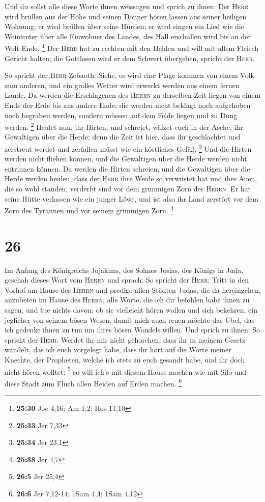  Und du sollst alle diese Worte ihnen weissagen und
sprich zu ihnen: Der \textsc{Herr} wird brüllen aus der Höhe und seinen
Donner hören lassen aus seiner heiligen Wohnung; er wird brüllen über
seine Hürden; er wird singen ein Lied wie die Weintreter über alle
Einwohner des Landes, des Hall erschallen wird bis an der Welt Ende.
\footnote{\textbf{25:30} Joe 4,16; Am 1,2; Hos 11,10} 
Der \textsc{Herr} hat zu rechten mit den Heiden und will mit allem
Fleisch Gericht halten; die Gottlosen wird er dem Schwert übergeben,
spricht der \textsc{Herr}.

 So spricht der \textsc{Herr} Zebaoth: Siehe, es wird
eine Plage kommen von einem Volk zum anderen, und ein großes Wetter wird
erweckt werden aus einem fernen Lande.  Da werden die
Erschlagenen des \textsc{Herrn} zu derselben Zeit liegen von einem Ende
der Erde bis ans andere Ende; die werden nicht beklagt noch aufgehoben
noch begraben werden, sondern müssen auf dem Felde liegen und zu Dung
werden. \footnote{\textbf{25:33} Jer 7,33}  Heulet nun,
ihr Hirten, und schreiet, wälzet euch in der Asche, ihr Gewaltigen über
die Herde; denn die Zeit ist hier, dass ihr geschlachtet und zerstreut
werdet und zerfallen müsst wie ein köstliches Gefäß. \footnote{\textbf{25:34}
  Jer 23,1}  Und die Hirten werden nicht fliehen können,
und die Gewaltigen über die Herde werden nicht entrinnen können.
 Da werden die Hirten schreien, und die Gewaltigen über
die Herde werden heulen, dass der \textsc{Herr} ihre Weide so verwüstet
hat  und ihre Auen, die so wohl standen, verderbt sind
vor dem grimmigen Zorn des \textsc{Herrn}.  Er hat seine
Hütte verlassen wie ein junger Löwe, und ist also ihr Land zerstört vor
dem Zorn des Tyrannen und vor seinem grimmigen Zorn. \footnote{\textbf{25:38}
  Jer 4,7}

\hypertarget{section-5}{%
\section{26}\label{section-5}}

 Im Anfang des Königreichs Jojakims, des Sohnes Josias,
des Königs in Juda, geschah dieses Wort vom \textsc{Herrn} und sprach:
 So spricht der \textsc{Herr}: Tritt in den Vorhof am
Hause des \textsc{Herrn} und predige allen Städten Judas, die da
hereingehen, anzubeten im Hause des \textsc{Herrn}, alle Worte, die ich
dir befohlen habe ihnen zu sagen, und tue nichts davon; 
ob sie vielleicht hören wollen und sich bekehren, ein jeglicher von
seinem bösen Wesen, damit mich auch reuen möchte das Übel, das ich
gedenke ihnen zu tun um ihres bösen Wandels willen.  Und
sprich zu ihnen: So spricht der \textsc{Herr}: Werdet ihr mir nicht
gehorchen, dass ihr in meinem Gesetz wandelt, das ich euch vorgelegt
habe,  dass ihr hört auf die Worte meiner Knechte, der
Propheten, welche ich stets zu euch gesandt habe, und ihr doch nicht
hören wolltet: \footnote{\textbf{26:5} Jer 25,4}  so will
ich's mit diesem Hause machen wie mit Silo und diese Stadt zum Fluch
allen Heiden auf Erden machen. \footnote{\textbf{26:6} Jer 7,12-14; 1Sam
  4,4; 1Sam 4,12}

